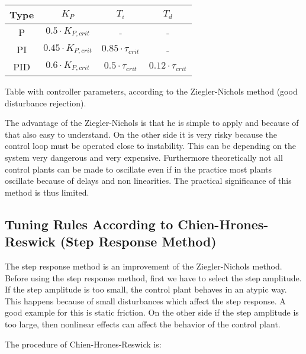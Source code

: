 \begin{center}
    \begin{threeparttable}
        \begin{tabular}{cccc}
            \toprule
            Type & $K_{P}$                   &  $T_{i}$                   &  $T_{d}$ \\
            \midrule
            P    &  $0.5  \cdot K_{P,crit}$  &  -                         &  -                         \\
            PI   &  $0.45 \cdot K_{P,crit}$  &  $0.85 \cdot \tau_{crit}$  &  -                         \\
            PID  &  $0.6  \cdot K_{P,crit}$  &  $0.5 \cdot \tau_{crit}$   &  $0.12 \cdot \tau_{crit}$  \\
            \bottomrule
        \end{tabular}
        \caption{Table with controller parameters, according to the Ziegler-Nichols method (good disturbance rejection).}
        \label{tab:ziegler_nichols}
    \end{threeparttable}
\end{center}

The advantage of the Ziegler-Nichols is that he is simple to apply and because
of that also  easy  to  understand. On the other side it is very risky because
the control loop must be operated close to instability.  This can be depending
on the system very dangerous and very expensive. Furthermore theoretically not
all control plants can be made to oscillate  even  if  in  the  practice  most
plants  oscillate  because  of  delays  and  non  linearities.  The  practical
significance of this method is thus limited.


\subsection{Tuning Rules According to Chien-Hrones-Reswick (Step Response Method)}

The step response method is  an  improvement  of  the  Ziegler-Nichols method.
Before using the step  response  method,  first  we  have  to  select the step
amplitude. If the step amplitude is too small, the control plant behaves in an
atypic way. This happens because of  small  disturbances which affect the step
response. A good example for this is static friction. On the other side if the
step amplitude is too large, then nonlinear effects can affect the behavior of
the control plant.

The procedure of Chien-Hrones-Reswick is:

